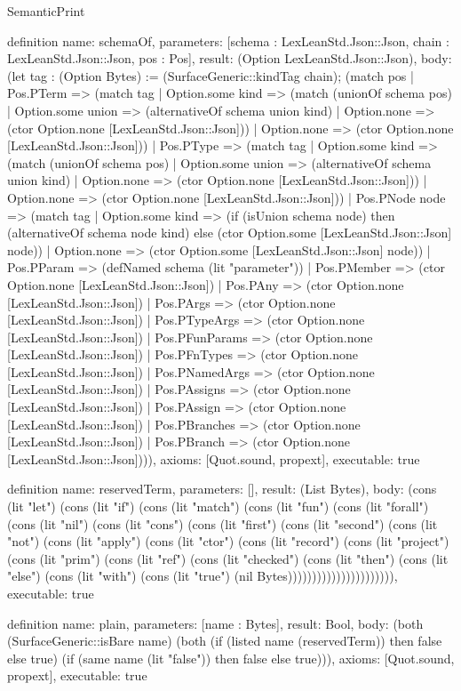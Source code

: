 \begin{lexlean}{SemanticPrint}
\begin{semanticmodule}
definition{
  name: schemaOf,
  parameters: [schema : LexLeanStd.Json::Json, chain : LexLeanStd.Json::Json, pos : Pos],
  result: (Option LexLeanStd.Json::Json),
  body: (let tag : (Option Bytes) := (SurfaceGeneric::kindTag chain); (match pos
    | Pos.PTerm => (match tag
      | Option.some kind => (match (unionOf schema pos)
        | Option.some union => (alternativeOf schema union kind)
        | Option.none => (ctor Option.none [LexLeanStd.Json::Json]))
      | Option.none => (ctor Option.none [LexLeanStd.Json::Json]))
    | Pos.PType => (match tag
      | Option.some kind => (match (unionOf schema pos)
        | Option.some union => (alternativeOf schema union kind)
        | Option.none => (ctor Option.none [LexLeanStd.Json::Json]))
      | Option.none => (ctor Option.none [LexLeanStd.Json::Json]))
    | Pos.PNode node => (match tag
      | Option.some kind => (if (isUnion schema node) then (alternativeOf schema node kind) else (ctor Option.some [LexLeanStd.Json::Json] node))
      | Option.none => (ctor Option.some [LexLeanStd.Json::Json] node))
    | Pos.PParam => (defNamed schema (lit "parameter"))
    | Pos.PMember => (ctor Option.none [LexLeanStd.Json::Json])
    | Pos.PAny => (ctor Option.none [LexLeanStd.Json::Json])
    | Pos.PArgs => (ctor Option.none [LexLeanStd.Json::Json])
    | Pos.PTypeArgs => (ctor Option.none [LexLeanStd.Json::Json])
    | Pos.PFunParams => (ctor Option.none [LexLeanStd.Json::Json])
    | Pos.PFnTypes => (ctor Option.none [LexLeanStd.Json::Json])
    | Pos.PNamedArgs => (ctor Option.none [LexLeanStd.Json::Json])
    | Pos.PAssigns => (ctor Option.none [LexLeanStd.Json::Json])
    | Pos.PAssign => (ctor Option.none [LexLeanStd.Json::Json])
    | Pos.PBranches => (ctor Option.none [LexLeanStd.Json::Json])
    | Pos.PBranch => (ctor Option.none [LexLeanStd.Json::Json]))),
  axioms: [Quot.sound, propext],
  executable: true
}

definition{
  name: reservedTerm,
  parameters: [],
  result: (List Bytes),
  body: (cons (lit "let") (cons (lit "if") (cons (lit "match") (cons (lit "fun") (cons (lit "forall") (cons (lit "nil") (cons (lit "cons") (cons (lit "first") (cons (lit "second") (cons (lit "not") (cons (lit "apply") (cons (lit "ctor") (cons (lit "record") (cons (lit "project") (cons (lit "prim") (cons (lit "ref") (cons (lit "checked") (cons (lit "then") (cons (lit "else") (cons (lit "with") (cons (lit "true") (nil Bytes)))))))))))))))))))))),
  executable: true
}

definition{
  name: plain,
  parameters: [name : Bytes],
  result: Bool,
  body: (both (SurfaceGeneric::isBare name) (both (if (listed name (reservedTerm)) then false else true) (if (same name (lit "false")) then false else true))),
  axioms: [Quot.sound, propext],
  executable: true
}


\end{semanticmodule}
\end{lexlean}
